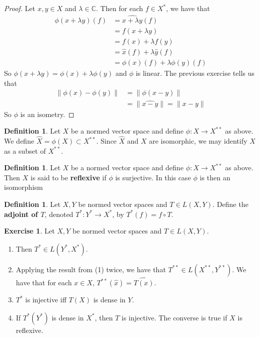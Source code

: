 \documentclass[12pt]{amsart}
\theoremstyle{definition}
\newtheorem{defn}[definition]{Definition}
\newtheorem{ex}[definition]{Exercise}
\newcommand{\lam}{\lambda}
\newcommand{\C}{\mathbb{C}}
\newcommand{\tbf}[1]{\textbf{#1}}
\DeclareMathOperator*{\0}{\mbf{0}}
\DeclareMathOperator*{\1}{\mbf{1}}
\newcommand{\lex}[1]{\label{ex:#1}}
\newcommand{\ld}[1]{\label{defn:#1}}
\begin{document}
	\begin{proof}
		Let $x,y \in X$ and $\lam \in \C$. Then for each $f \in X^*$, we have that 
		\begin{align*}
			\phi(x+ \lam y)(f) 
			&= \widehat{x+ \lam y}(f) \\
			&= f(x+\lam y) \\
			&= f(x) + \lam f(y) \\
			&= \hat{x}(f) + \lam \hat{y}(f)\\
			&= \phi(x)(f) + \lam \phi(y)(f)
		\end{align*} 
		So $\phi(x+ \lam y) = \phi(x) + \lam \phi(y)$ and $\phi$ is linear. The previous exercise tells us that 
		\begin{align*}
			\|\phi(x) - \phi(y) \|
			&= \|\phi(x-y)\|\\
			&= \|\widehat{x-y} \|= \|x-y \|
		\end{align*}
		So $\phi$ is an isometry.
	\end{proof}
	
	\begin{defn} \ld{}
		Let $X$ be a normed vector space and define $\phi:X \rightarrow X^{**}$ as above. We define $\widehat{X} = \phi(X) \subset X^{**}$. Since $\widehat{X}$ and $X$ are isomorphic, we may identify $X$ as a subset of $X^{**}$. 
	\end{defn}
	
	\begin{defn} \ld{}
		Let $X$ be a normed vector space and define $\phi:X \rightarrow X^{**}$ as above. Then $X$ is said to be \tbf{reflexive} if $\phi$ is surjective. In this case $\phi$ is then an isomorphism
	\end{defn}

	\begin{defn}
	Let $X,Y$ be normed vector spaces and $T \in L(X,Y)$. Define the \tbf{adjoint of $T$}, denoted  $T^*:Y^* \rightarrow X^*$, by $T^*(f) = f \circ T$. 
	\end{defn}
	
	\begin{ex} \lex{}
		Let $X,Y$ be normed vector spaces and $T \in L(X,Y)$. 
		\begin{enumerate}
			\item Then $T^* \in L(Y^*, X^*)$.
			\item Applying the result from (1) twice, we have that $T^{**} \in L(X^{**},Y^{**})$. We have that for each $x \in X$, $T^{**}(\hat{x}) = \widehat{T(x)}$.
			\item $T^*$ is injective iff $T(X)$ is dense in $Y$.
			\item If $T^*(Y^*)$ is dense in $X^*$, then $T$ is injective. The converse is true if $X$ is reflexive.
		\end{enumerate}
	\end{ex}
	
\end{document}
